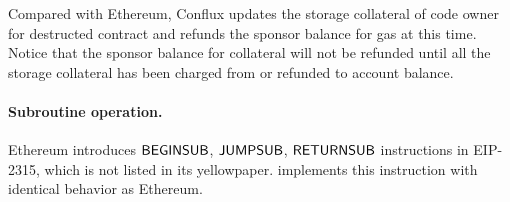 Compared with Ethereum, Conflux updates the storage collateral of code owner for destructed contract and refunds the sponsor balance for gas at this time. Notice that the sponsor balance for collateral will not be refunded until all the storage collateral has been charged from or refunded to account balance. 

\paragraph{Subroutine operation.} Ethereum introduces $\mathsf{BEGINSUB}$, $\mathsf{JUMPSUB}$, $\mathsf{RETURNSUB}$ instructions in EIP-2315, which is not listed in its yellowpaper. 
{\name} implements this instruction with identical behavior as Ethereum.